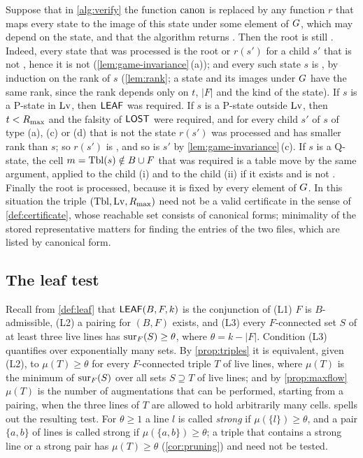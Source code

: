 \begin{remark}\label{rem:any-image}
Suppose that in \cref{alg:verify} the function $\operatorname{canon}$ is replaced by any function $r$ that maps every
state to the image of this state under some element of $G$, which may depend on the state, and that
the algorithm returns \accept. Then the root is still \WON. Indeed, every state that was processed is
the root or $r(s')$ for a child $s'$ that is not \VOID, hence it is not \VOID{}
(\cref{lem:game-invariance}\,(a)); and every such state $s$
is \WON, by induction on the rank of $s$ (\cref{lem:rank}; a state and its images under $G$ have the
same rank, since the rank depends only on $t$, $|F|$ and the kind of the state). If $s$ is a P-state
in $\mathrm{Lv}$, then $\mathsf{LEAF}$ was required. If $s$ is a P-state outside $\mathrm{Lv}$, then $t<R_{\max}$ and the
falsity of $\mathsf{LOST}$ were required, and for every child $s'$ of $s$ of type (a), (c) or (d) that is not
\VOID{} the state $r(s')$ was processed and has smaller rank than $s$; so $r(s')$ is \WON, and so is
$s'$ by \cref{lem:game-invariance}\,(c). If $s$ is a Q-state, the cell $m=\mathrm{Tbl}(s)\notin B\cup F$ that
was required is a table move by the same argument, applied to the child (i) and to the child (ii) if
it exists and is not \VOID. Finally the root is processed, because it is fixed by every element of
$G$. In this situation the triple $(\mathrm{Tbl},\mathrm{Lv},R_{\max})$ need not be a valid certificate in the sense of
\cref{def:certificate}, whose reachable set consists of canonical forms; minimality of the stored
representative matters for finding the entries of the two files, which are listed by canonical form.
\end{remark}

\subsection{The leaf test}\label{ssec:algleaf}

Recall from \cref{def:leaf} that $\mathsf{LEAF}(B,F,k)$ is the conjunction of (L1) $F$ is $B$-admissible, (L2)
a pairing for $(B,F)$ exists, and (L3) every $F$-connected set $S$ of at least three live lines has
$\operatorname{sur}_F(S)\ge\theta$, where $\theta=k-|F|$. Condition (L3) quantifies over exponentially many sets. By
\cref{prop:triples} it is equivalent, given (L2), to $\mu(T)\ge\theta$ for every $F$-connected triple $T$
of live lines, where $\mu(T)$ is the minimum of $\operatorname{sur}_F(S)$ over all sets $S\supseteq T$ of live lines; and
by \cref{prop:maxflow} $\mu(T)$ is the number of augmentations that can be performed, starting from a
pairing, when the three lines of $T$ are allowed to hold arbitrarily many cells.  spells
out the resulting test. For
$\theta\ge 1$ a line $l$ is called \emph{strong} if $\mu(\{l\})\ge\theta$, and a pair $\{a,b\}$ of lines is
called strong if $\mu(\{a,b\})\ge\theta$; a triple that contains a strong line or a strong pair has
$\mu(T)\ge\theta$ (\cref{cor:pruning}) and need not be tested.


